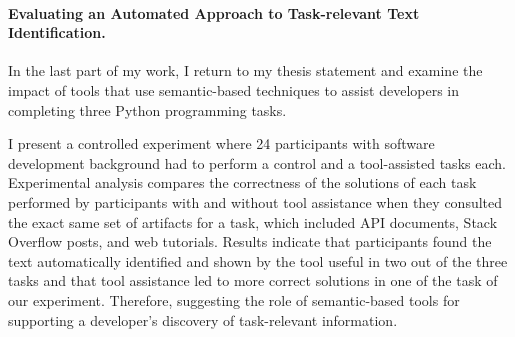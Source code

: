 \paragraph{\textbf{Evaluating an Automated Approach to Task-relevant Text Identification.}} 




In the last part of my work, I return to my thesis statement
and examine the impact of tools that use semantic-based techniques to assist developers in 
completing three Python programming tasks. 



I present a controlled experiment where 24 participants with software development background had to 
perform a control and a tool-assisted tasks each.
Experimental analysis compares the correctness of the solutions of each task 
performed by participants with and without tool assistance 
when they consulted the exact same set of artifacts for a task, which included 
API documents, Stack Overflow posts, and web tutorials. 
Results indicate that participants found the text automatically identified
and shown by the tool useful in two out of the three tasks and that tool assistance led to more correct solutions 
in one of the task of our experiment.
Therefore, suggesting the role of semantic-based tools for supporting a developer's discovery 
of task-relevant information.




